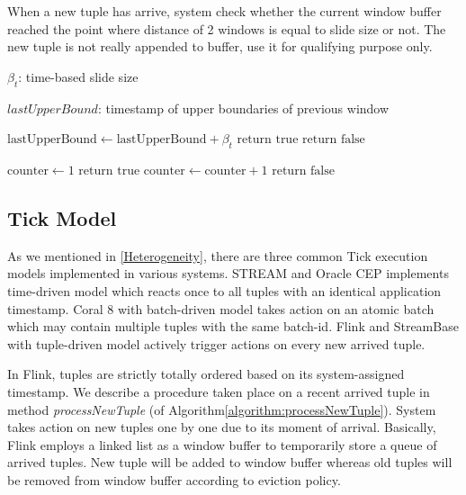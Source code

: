\begin{algorithm}
\caption{Whether system should trigger a new window }
\label{algorithm:notifyTrigger}
When a new tuple has arrive, system check whether the current window buffer reached the point where distance of 2 windows is equal to slide size or not. The new tuple is not really appended to buffer, use it for qualifying purpose only.

\algrenewcommand{}
\begin{algorithmic}[1]
  	
  			{$\beta_t$: time-based slide size }

  			{$lastUpperBound$: timestamp of upper boundaries of previous window}
    
   
    
    			\State $\textrm{lastUpperBound} \gets \textrm{lastUpperBound} + \beta_t$
    			\State $\textrm{return true}$
    		\Else
    			\State$\textrm{return false}$
    		\EndIf
    
    \Else {}
    			\State $\textrm{counter} \gets 1$
    			\State $\textrm{return true}$
    		\Else
    			\State $\textrm{counter} \gets \textrm{counter} + 1$
    			\State $\textrm{return false}$
    		\EndIf
    	\EndIf
    
    
    \EndProcedure
  \end{algorithmic}
\end{algorithm}


\subsection{Tick Model}
As we mentioned in \ref{Heterogeneity}, there are three common Tick execution models\citep{Dindar:2013} implemented in various systems. STREAM and Oracle CEP implements time-driven model which reacts once to all tuples with an identical application timestamp. Coral 8 with batch-driven model takes action on an atomic batch which may contain multiple tuples with the same batch-id. Flink and StreamBase with tuple-driven model actively trigger actions on every new arrived tuple.

In Flink, tuples are strictly totally ordered based on its system-assigned timestamp. We describe a procedure taken place on a recent arrived tuple in method \textit{processNewTuple}  (of Algorithm\ref{algorithm:processNewTuple}). 
System takes action on new tuples one by one due to its moment of arrival. 
Basically, Flink employs a linked list as a window buffer to temporarily store a queue of arrived tuples. New tuple will be added to window buffer whereas old tuples will be removed from window buffer according to eviction policy.

